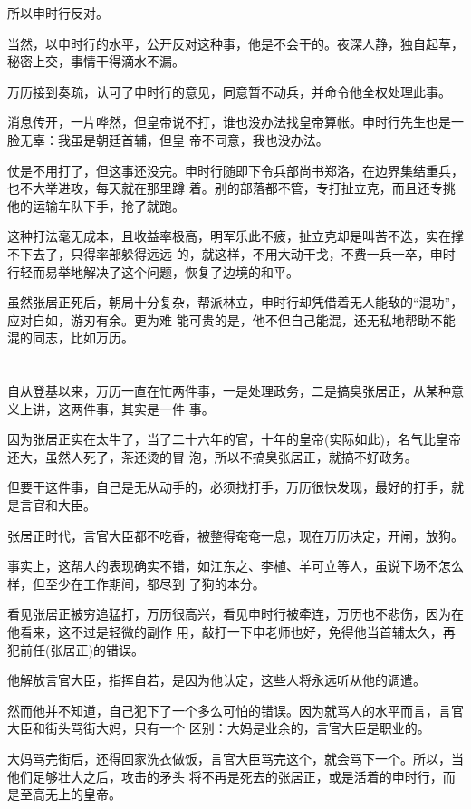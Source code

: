 \documentclass[11pt,a4paper,onecolumn]{article}
\begin{document}
所以申时行反对。

当然，以申时行的水平，公开反对这种事，他是不会干的。夜深人静，独自起草，秘密上交，事情干得滴水不漏。

万历接到奏疏，认可了申时行的意见，同意暂不动兵，并命令他全权处理此事。

消息传开，一片哗然，但皇帝说不打，谁也没办法找皇帝算帐。申时行先生也是一脸无辜：我虽是朝廷首辅，但皇
帝不同意，我也没办法。

仗是不用打了，但这事还没完。申时行随即下令兵部尚书郑洛，在边界集结重兵，也不大举进攻，每天就在那里蹲
着。别的部落都不管，专打扯立克，而且还专挑他的运输车队下手，抢了就跑。

这种打法毫无成本，且收益率极高，明军乐此不疲，扯立克却是叫苦不迭，实在撑不下去了，只得率部躲得远远
的，就这样，不用大动干戈，不费一兵一卒，申时行轻而易举地解决了这个问题，恢复了边境的和平。

虽然张居正死后，朝局十分复杂，帮派林立，申时行却凭借着无人能敌的``混功''，应对自如，游刃有余。更为难
能可贵的是，他不但自己能混，还无私地帮助不能混的同志，比如万历。

\section[\thesection]{}

自从登基以来，万历一直在忙两件事，一是处理政务，二是搞臭张居正，从某种意义上讲，这两件事，其实是一件
事。

因为张居正实在太牛了，当了二十六年的官，十年的皇帝(实际如此)，名气比皇帝还大，虽然人死了，茶还烫的冒
泡，所以不搞臭张居正，就搞不好政务。

但要干这件事，自己是无从动手的，必须找打手，万历很快发现，最好的打手，就是言官和大臣。

张居正时代，言官大臣都不吃香，被整得奄奄一息，现在万历决定，开闸，放狗。

事实上，这帮人的表现确实不错，如江东之、李植、羊可立等人，虽说下场不怎么样，但至少在工作期间，都尽到
了狗的本分。

看见张居正被穷追猛打，万历很高兴，看见申时行被牵连，万历也不悲伤，因为在他看来，这不过是轻微的副作
用，敲打一下申老师也好，免得他当首辅太久，再犯前任(张居正)的错误。

他解放言官大臣，指挥自若，是因为他认定，这些人将永远听从他的调遣。

然而他并不知道，自己犯下了一个多么可怕的错误。因为就骂人的水平而言，言官大臣和街头骂街大妈，只有一个
区别：大妈是业余的，言官大臣是职业的。

大妈骂完街后，还得回家洗衣做饭，言官大臣骂完这个，就会骂下一个。所以，当他们足够壮大之后，攻击的矛头
将不再是死去的张居正，或是活着的申时行，而是至高无上的皇帝。
\end{document}
